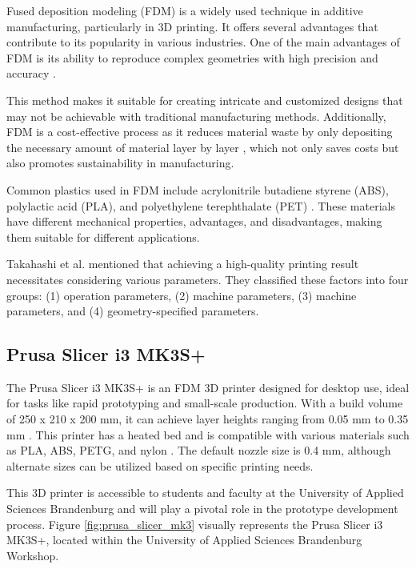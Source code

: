 Fused deposition modeling (FDM) is a widely used technique in additive manufacturing, particularly in 3D printing. It offers several advantages that contribute to its popularity in various industries. One of the main advantages of FDM is its ability to reproduce complex geometries with high precision and accuracy \cite{Gordeev18}.

This method makes it suitable for creating intricate and customized designs that may not be achievable with traditional manufacturing methods. Additionally, FDM is a cost-effective process as it reduces material waste by only depositing the necessary amount of material layer by layer \cite{Gordeev18}, which not only saves costs but also promotes sustainability in manufacturing.

Common plastics used in FDM include acrylonitrile butadiene styrene (ABS), polylactic acid (PLA), and polyethylene terephthalate (PET) \cite{Teamm17}. These materials have different mechanical properties, advantages, and disadvantages, making them suitable for different applications.

Takahashi et al. \cite{Takahashi17} mentioned that achieving a high-quality printing result necessitates considering various parameters. They classified these factors into four groups: (1) operation parameters, (2) machine parameters, (3) machine parameters, and (4) geometry-specified parameters.

\subsection{Prusa Slicer i3 MK3S+}
\label{subsec:prusa_slicer_mk3s}

The Prusa Slicer i3 MK3S+ is an FDM 3D printer designed for desktop use, ideal for tasks like rapid prototyping and small-scale production. With a build volume of 250 x 210 x 200 mm, it can achieve layer heights ranging from 0.05 mm to 0.35 mm \cite{Prusa}. This printer has a heated bed and is compatible with various materials such as PLA, ABS, PETG, and nylon \cite{Prusa}. The default nozzle size is 0.4 mm, although alternate sizes can be utilized based on specific printing needs.

This 3D printer is accessible to students and faculty at the University of Applied Sciences Brandenburg and will play a pivotal role in the prototype development process. Figure \ref{fig:prusa_slicer_mk3} visually represents the Prusa Slicer i3 MK3S+, located within the University of Applied Sciences Brandenburg Workshop.

